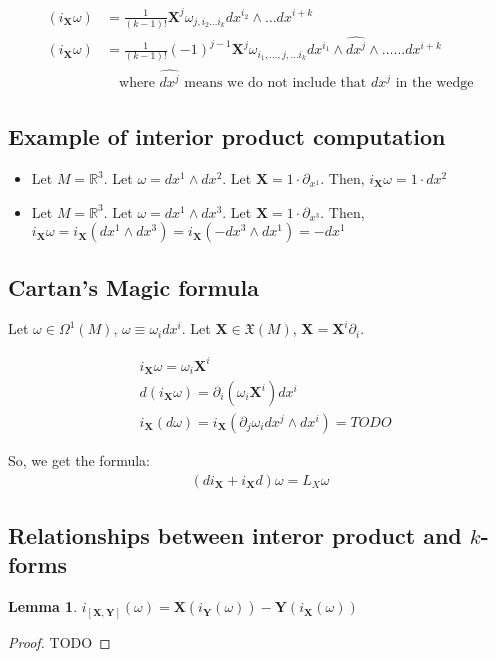 \documentclass[11pt]{book}
\newcommand{\boldX}{\ensuremath{\mathbf{X}}}
\newcommand{\boldY}{\ensuremath{\mathbf{Y}}}
\newtheorem{lemma}{Lemma}
\newtheorem{proof}{Proof}
\begin{document}
\begin{align*}
    (i_{\mathbf X} \omega) &= \frac{1}{(k-1)!}  \mathbf X^j \omega_{j, i_2 \dots i_k} dx^{i_2} \wedge \dots dx^{i+k} \\
    (i_{\mathbf X} \omega) &= \frac{1}{(k-1)!}  (-1)^{j-1} \mathbf X^j \omega_{i_1, \dots, j, \dots i_k} dx^{i_1} \wedge \widehat{dx^j} \wedge \dots \dots dx^{i+k} \\
    &\quad \text{where $\widehat{dx^j}$ means we do not include that $dx^j$ in the wedge}
\end{align*}

\subsection{Example of interior product computation}
\begin{itemize}
    \item Let $M = \mathbb R^3$. Let $\omega = dx^1 \wedge dx^2$. Let $\mathbf X = 1 \cdot \partial_{x^1}$.
Then, $i_\mathbf X \omega = 1 \cdot dx^2$


\item Let $M = \mathbb R^3$. Let $\omega = dx^1 \wedge dx^3$. Let $\mathbf X = 1 \cdot \partial_{x^3}$.
Then, $i_{\mathbf X} \omega = i_{\mathbf X} (dx^1 \wedge dx^3) = i_{\mathbf X}(-dx^3 \wedge dx^1) = -dx^1$
\end{itemize}

\subsection{Cartan's Magic formula}
Let $\omega \in \Omega^1(M)$, $\omega \equiv \omega_i dx^i$.
Let $\mathbf X \in \mathfrak X(M)$, $\mathbf X = \mathbf X^i \partial_i$.

\begin{align*}
&i_{\mathbf X} \omega = \omega_i \mathbf X^i \\
&d(i_{\mathbf X} \omega) = \partial_i (\omega_i \mathbf X^i) dx^i \\
&i_{\mathbf X}(d \omega) = i_{\mathbf X}( \partial_j \omega_i dx^j \wedge dx^i)
	= TODO %
\end{align*}

So, we get the formula:
\begin{align*}
 (d i_{\mathbf X} + i_{\mathbf X} d) \omega = L_X \omega
\end{align*}

\subsection{Relationships between interor product and $k$-forms}
\begin{lemma}
$i_{[\mathbf X, \mathbf Y]}(\omega) = \boldX(i_\boldY (\omega)) - \boldY(i_\boldX (\omega))$
\end{lemma}
\begin{proof} TODO \end{proof}
\end{document}
